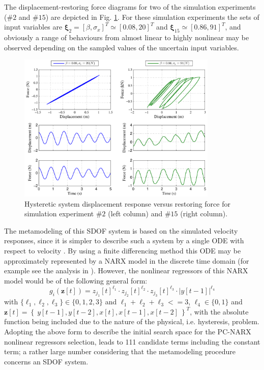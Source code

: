 \documentclass[preprint,3p,review,times,11pt]{elsarticle}
\newcommand{\bld}[1]{\boldsymbol{#1}}
\newcommand{\bxi}{\bld{\xi}}
\begin{document}
The displacement-restoring force diagrams for two of the simulation experiments ($\#2$ and $\#15$) are depicted in Fig. \ref{fig:boucwen_randexc}. For these simulation experiments the sets of input variables are $\bxi_2 = [\beta , \sigma_x]^T \simeq [ 0.08, 20]^T $ and $\bxi_{15} \simeq [0.86 , 91]^T $, and obviously a range of behaviours from almost linear to highly nonlinear may be observed depending on the sampled values of the uncertain input variables.

\begin{figure}[t!]
\begin{center}
\includegraphics[width = 0.85\textwidth]{figs/boucwen_randexci.pdf}
\caption{Hysteretic system displacement response versus restoring force for simulation experiment $\#2$ (left column) and $\#15$ (right column). \label{fig:boucwen_randexc}}
\end{center}
\end{figure}

The metamodeling of this SDOF system is based on the simulated velocity responses, since it is simpler to describe such a system by a single ODE with respect to velocity \cite{Worden-Barthorpe2012}. By using a finite differencing method this ODE may be approximately represented by a NARX model in the discrete time domain (for example see the analysis in \cite{Worden-Barthorpe2012}). However, the nonlinear regressors of this NARX model would be of the following general form:
%
$$ g_i({\bld z}[t]) = z_{j_1}[t]^{\ell_1} \cdot z_{j_2}[t]^{\ell_2} \cdot z_{j_3}[t]^{\ell_3} \cdot |y[t-1]|^{\ell_4}$$
%  
with $\{\ell_1,\ell_2,\ell_3\} \in \{0,1,2,3\}$ and $ \ell_1 + \ell_2 + \ell_3 <= 3 $, $\ell_4 \in\{ 0,1 \}$ and ${\bld z}[t] = \left\{ \ y[t-1], y[t-2], x[t], x[t-1], x[t-2]\ \right\}^{T}$, with the absolute function being included due to the nature of the physical, i.e. hysteresis, problem. Adopting the above form to describe the initial search space for the PC-NARX nonlinear regressors selection, leads to 111 candidate terms including the constant term; a rather large number considering that the metamodeling procedure concerns an SDOF system. 
\end{document}
